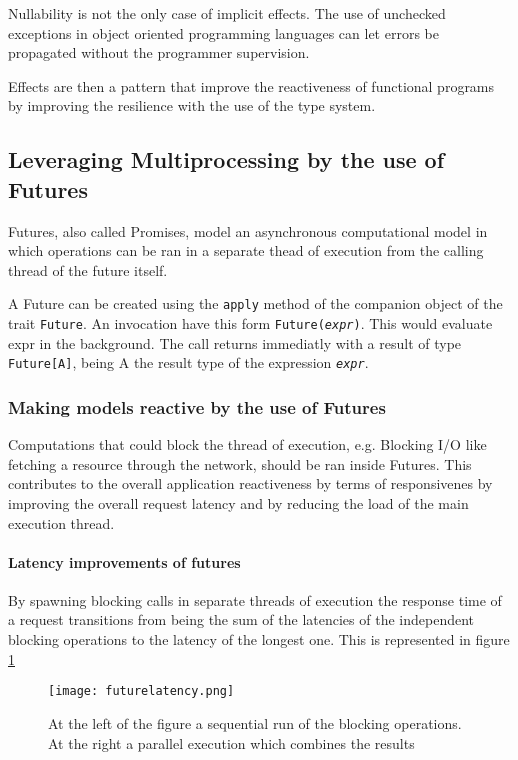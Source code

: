 \documentclass[../main.tex]{subfiles}
\begin{document}
Nullability is not the only case of implicit effects. The use of unchecked
exceptions in object oriented programming languages can let errors be propagated
without the programmer supervision.

Effects are then a pattern that improve the reactiveness of functional programs by
improving the resilience with the use of the type system.

\subsection{Leveraging Multiprocessing by the use of Futures}
Futures, also called Promises, model an asynchronous computational model in
which operations can be ran in a separate thead of execution from the calling
thread of the future itself.

A Future can be created using the \texttt{apply} method of the companion object
of the trait \texttt{Future}. An invocation have this form
\texttt{Future(\textit{expr})}. This would evaluate expr in the background. The
call returns immediatly with a result of type \texttt{Future[A]}, being A the result type
of the expression \texttt{\textit{expr}}.

\subsubsection{Making models reactive by the use of Futures}

Computations that could block the thread of execution, e.g. Blocking I/O like
fetching a resource through the network, should be ran inside Futures. This
contributes to the overall application reactiveness by terms of responsivenes by
improving the overall request latency and by reducing the load of the main
execution thread.

\paragraph{Latency improvements of futures}

By spawning blocking calls in separate threads of execution the response time of
a request transitions from being the sum of the latencies of the independent
blocking operations to the latency of the longest one. This is represented in
figure \ref{fig:futurelatency}

\begin{figure}[ht]
  \centering
  \texttt{[image: futurelatency.png]}
  \caption{\label{fig:futurelatency}
    At the left of the figure a sequential run of the blocking operations. At
    the right a parallel execution which combines the results
  }
\end{figure}
\end{document}
